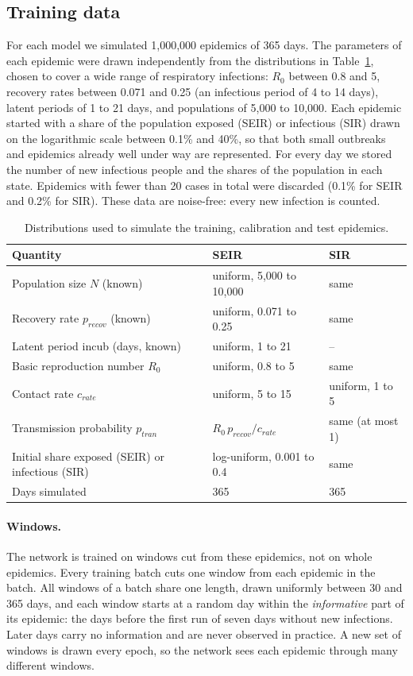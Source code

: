 \documentclass[12pt]{article}
\begin{document}
\subsection{Training data}\label{sec:training-data}

For each model we simulated 1,000,000 epidemics of 365 days. The parameters of each epidemic were
drawn independently from the distributions in Table~\ref{tab:priors}, chosen to cover a wide range
of respiratory infections: $R_0$ between 0.8 and 5, recovery rates between 0.071 and 0.25 (an
infectious period of 4 to 14 days), latent periods of 1 to 21 days, and populations of 5,000 to
10,000. Each epidemic started with a share of the population exposed (SEIR) or infectious (SIR)
drawn on the logarithmic scale between 0.1\% and 40\%, so that both small outbreaks and epidemics
already well under way are represented. For every day we stored the number of new infectious people
and the shares of the population in each state. Epidemics with fewer than 20 cases in total were
discarded (0.1\% for SEIR and 0.2\% for SIR). These data are noise-free: every new infection is
counted.

\begin{table}[htbp]
\centering
\caption{Distributions used to simulate the training, calibration and test epidemics.}
\label{tab:priors}
\small
\begin{tabular}{lll}
\toprule
Quantity & SEIR & SIR \\
\midrule
Population size $N$ (known) & uniform, 5,000 to 10,000 & same \\
Recovery rate $p_{recov}$ (known) & uniform, 0.071 to 0.25 & same \\
Latent period incub (days, known) & uniform, 1 to 21 & -- \\
Basic reproduction number $R_0$ & uniform, 0.8 to 5 & same \\
Contact rate $c_{rate}$ & uniform, 5 to 15 & uniform, 1 to 5 \\
Transmission probability $p_{tran}$ & $R_0\,p_{recov}/c_{rate}$ & same (at most 1) \\
Initial share exposed (SEIR) or infectious (SIR) & log-uniform, 0.001 to 0.4 & same \\
Days simulated & 365 & 365 \\
\bottomrule
\end{tabular}
\end{table}

\paragraph{Windows.} The network is trained on windows cut from these epidemics, not on whole
epidemics. Every training batch cuts one window from each epidemic in the batch. All windows of a
batch share one length, drawn uniformly between 30 and 365 days, and each window starts at a random
day within the \emph{informative} part of its epidemic: the days before the first run of seven days
without new infections. Later days carry no information and are never observed in practice. A new set
of windows is drawn every epoch, so the network sees each epidemic through many different windows.
\end{document}

